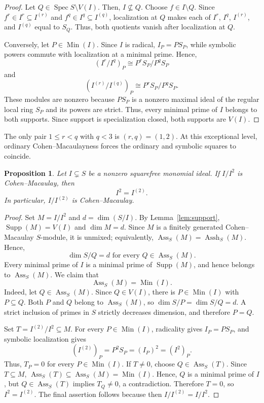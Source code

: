 \documentclass[12pt]{amsart}
\theoremstyle{plain}
\newtheorem{proposition}[theorem]{Proposition}
\theoremstyle{definition}
\theoremstyle{remark}
\begin{document}
\begin{proof} Let $Q \in \operatorname{Spec } S \setminus V(I)$. Then, $I \not\subseteq Q$. Choose $f\in I\setminus Q$. Since
$f^r\in I^r\subseteq I^{(r)}$ and $f^q\in I^q\subseteq I^{(q)}$,
localization at $Q$ makes each of $I^r$, $I^q$, $I^{(r)}$, and $I^{(q)}$
equal to $S_Q$. Thus, both quotients vanish after localization at $Q$.

Conversely, let $P\in\operatorname{Min}(I)$. Since $I$ is radical,
$I_P=PS_P$, while symbolic powers commute with localization at a minimal
prime. Hence,
$$
(I^r/I^q)_P\cong P^rS_P/P^qS_P
$$
and
$$
(I^{(r)}/I^{(q)})_P\cong P^rS_P/P^qS_P.
$$
These modules are nonzero because $PS_P$ is a nonzero maximal ideal of the regular local ring $S_P$ and its powers are strict. Thus, every minimal prime of $I$
belongs to both supports. Since support is specialization closed, both supports
are $V(I)$.
\end{proof}

The only pair $1\le r<q$ with $q<3$ is $(r,q)=(1,2)$. At this exceptional
level, ordinary Cohen--Macaulayness forces the ordinary and symbolic squares
to coincide.

\begin{proposition}\label{prop:second-symbolic}
Let $I\subsetneq S$ be a nonzero squarefree monomial ideal. If $I/I^2$ is
Cohen--Macaulay, then
$$
I^2=I^{(2)}.
$$
In particular, $I/I^{(2)}$ is Cohen--Macaulay.
\end{proposition}

\begin{proof}
Set $M=I/I^2$ and $d=\dim(S/I)$. By Lemma~\ref{lem:support},
$\operatorname{Supp}(M)=V(I)$ and $\dim M=d$. Since $M$ is a finitely
generated Cohen--Macaulay $S$-module, it is unmixed; equivalently,
$\operatorname{Ass}_S(M)=\operatorname{Assh}_S(M)$. Hence,
$$
\dim S/Q=d\text{ for every }Q\in\operatorname{Ass}_S(M).
$$
Every minimal prime of $I$ is a minimal prime of $\operatorname{Supp}(M)$,
and hence belongs to $\operatorname{Ass}_S(M)$. We claim that
$$
\operatorname{Ass}_S(M)=\operatorname{Min}(I).
$$
Indeed, let $Q\in\operatorname{Ass}_S(M)$. Since $Q\in V(I)$, there is
$P\in\operatorname{Min}(I)$ with $P\subseteq Q$. Both $P$ and $Q$ belong
to $\operatorname{Ass}_S(M)$, so $\dim S/P=\dim S/Q=d$. A strict
inclusion of primes in $S$ strictly decreases dimension, and therefore $P=Q$.

Set $T=I^{(2)}/I^2\subseteq M$. For every $P\in\operatorname{Min}(I)$,
radicality gives $I_P=PS_P$, and symbolic localization gives
$$
(I^{(2)})_P=P^2S_P=(I_P)^2=(I^2)_P.
$$
Thus, $T_P=0$ for every $P\in\operatorname{Min}(I)$. If $T\neq0$, choose
$Q\in\operatorname{Ass}_S(T)$. Since $T\subseteq M$,
$\operatorname{Ass}_S(T)\subseteq\operatorname{Ass}_S(M)=\operatorname{Min}(I)$.
Hence, $Q$ is a minimal prime of $I$, but $Q\in\operatorname{Ass}_S(T)$
implies $T_Q\neq0$, a contradiction. Therefore $T=0$, so
$I^2=I^{(2)}$. The final assertion follows because then
$I/I^{(2)}=I/I^2$.
\end{proof}
\end{document}

